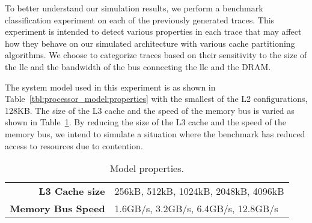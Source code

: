 To better understand our simulation results, we perform a benchmark classification experiment on each of the previously generated traces.
This experiment is intended to detect various properties in each trace that may affect how they behave on our simulated architecture with various cache partitioning algorithms.
We choose to categorize traces based on their sensitivity to the size of the \gls{llc} and the bandwidth of the bus connecting the \gls{llc} and the DRAM.

The system model used in this experiment is as shown in Table~\ref{tbl:processor_model:properties} with the smallest of the L2 configurations, 128KB.
The size of the L3 cache and the speed of the memory bus is varied as shown in Table~\ref{tbl:benchmarks_workloads:classification_model}.
By reducing the size of the L3 cache and the speed of the memory bus, we intend to simulate a situation where the benchmark has reduced access to resources due to contention.

\begin{table}[ht]
\centering
\begin{tabular}{rl}
\toprule
\bf{L3 Cache size} & 256kB, 512kB, 1024kB, 2048kB, 4096kB \\
\bf{Memory Bus Speed}   & 1.6GB/s, 3.2GB/s, 6.4GB/s, 12.8GB/s \\
\bottomrule                             
\end{tabular}
\caption{Model properties.}
\label{tbl:benchmarks_workloads:classification_model}
\end{table}

